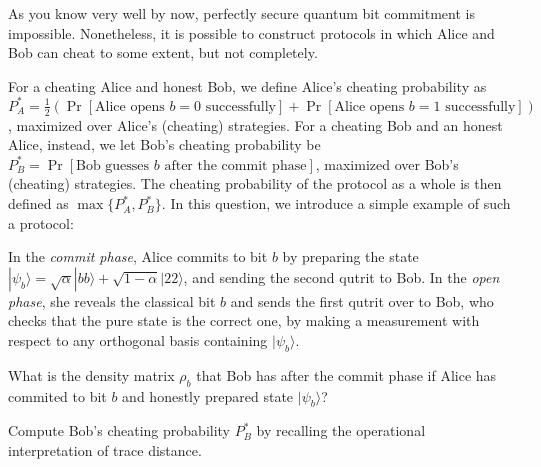 \documentclass[a4paper,10pt,landscape,twocolumn]{scrartcl}
\newcommand{\ket}[1]{| #1 \rangle}
\begin{document}
\begin{exercise} %
As you know very well by now, perfectly secure quantum bit commitment is impossible. Nonetheless, it is possible to construct protocols in which Alice and Bob can cheat to some extent, but not completely. 

For a cheating Alice and honest Bob, we define Alice's cheating probability as $P_A^* = \frac12(\Pr[\text{Alice opens $b=0$ successfully}]+ \Pr[\text{Alice opens $b=1$ successfully}])$, maximized over Alice's (cheating) strategies. For a cheating Bob and an honest Alice, instead, we let Bob's cheating probability be
$P_B^*= \Pr[\text{Bob guesses $b$ after the commit phase}]$, maximized over Bob's (cheating) strategies. The cheating probability of the protocol as a whole is then defined as $\max\{P_A^*,P_B^*\}$. In this question, we introduce a simple example of such a protocol:

In the \emph{commit phase}, Alice commits to bit $b$ by preparing the state 
$\ket{\psi_b}= \sqrt{\alpha} \ket{bb} + \sqrt{1-\alpha} \ket{22}$, and sending the second qutrit to Bob. In the \emph{open phase}, she reveals the classical bit $b$ and sends the first qutrit over to Bob, who checks that the pure state is the correct one, by making a measurement with respect to any orthogonal basis containing $\ket{\psi_b}$.

\begin{subex}
What is the density matrix $\rho_b$ that Bob has after the commit phase if Alice has commited to bit $b$ and honestly prepared state $\ket{\psi_b}$?
\end{subex}

\begin{subex} \label{subex:bob}
Compute Bob's cheating probability $P_B^*$ by recalling the operational interpretation of trace distance.
\end{subex}



\end{exercise}
\end{document}
